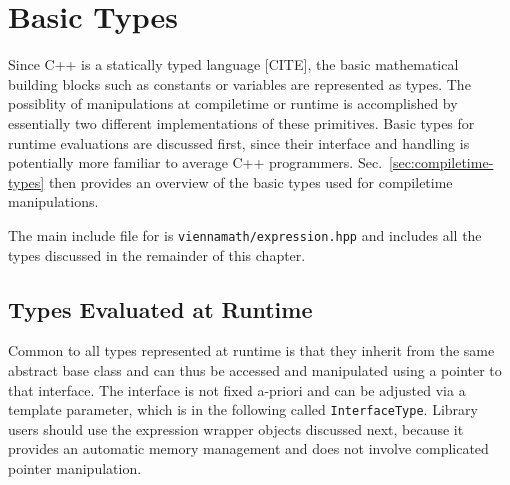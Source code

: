 
\chapter{Basic Types} \label{chap:basics}

Since C++ is a statically typed language [CITE], the basic mathematical building blocks such as constants or variables are represented as types.
The possiblity of manipulations at compiletime or runtime is accomplished by essentially
two different implementations of these primitives.
Basic types for runtime evaluations are discussed first, since their interface and handling is potentially more familiar to average C++ programmers.
Sec.~\ref{sec:compiletime-types} then provides an overview of the basic types used for compiletime manipulations.

The main include file for {\ViennaMath} is \lstinline|viennamath/expression.hpp| and includes all the types discussed in the remainder of this chapter.




\section{Types Evaluated at Runtime} \label{sec:runtime-types}
Common to all types represented at runtime is that they inherit from the same abstract base class 
and can thus be accessed and manipulated using a pointer to that interface.
The interface is not fixed a-priori and can be adjusted via a template parameter, which is in the following called \lstinline|InterfaceType|.
Library users should use the expression wrapper objects discussed next, because it provides an automatic memory management and does not involve complicated pointer manipulation.




